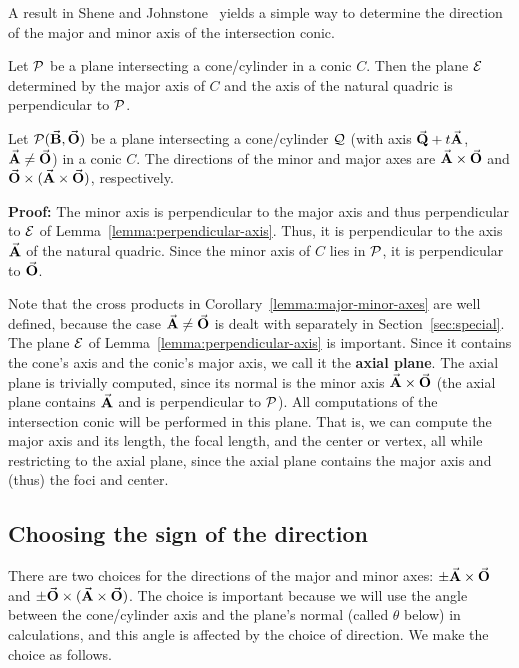 A result in Shene and Johnstone~\cite{shene:1991} 
yields a simple way to determine the direction of the 
major and minor axis of the intersection conic.  

\begin{lemma}
\label{lemma:perpendicular-axis}
    Let ${\cal P}$ be a plane intersecting a cone/cylinder in a conic 
$C$.  Then the plane ${\cal E}$ determined by the major axis of $C$ and the 
axis of the natural quadric is perpendicular to ${\cal P}$.
\end{lemma}

\begin{corollary}
\label{lemma:major-minor-axes}
    Let ${\cal P}(\vec{\bf B},\vec{\bf O})$ be a plane 
intersecting a cone/cylinder ${\cal Q}$ (with axis $\vec{\bf Q}+t\vec{\bf A}$,
$\vec{\bf A}\neq\vec{\bf O}$) in a conic $C$.
The directions of the minor
and major axes are $\vec{\bf A}\times\vec{\bf O}$ and 
$\vec{\bf O}\times(\vec{\bf A}\times\vec{\bf O})$, respectively.  
\end{corollary}
{\bf Proof:}
The minor axis is perpendicular to the major axis and thus perpendicular
to ${\cal E}$ of Lemma~\ref{lemma:perpendicular-axis}.
Thus, it is perpendicular to the axis $\vec{\bf A}$ of the natural quadric.
Since the minor axis of $C$ lies in ${\cal P}$,
it is perpendicular to $\vec{\bf O}$.
\QED

Note that the cross products in
Corollary~\ref{lemma:major-minor-axes} are well defined, because the case
$\vec{\bf A} \neq \vec{\bf O}$ is dealt with separately in 
Section~\ref{sec:special}.
The plane ${\cal E}$ of Lemma~\ref{lemma:perpendicular-axis} is important.
Since it contains the cone's axis and the conic's major axis,
we call it the {\bf axial plane}.
The axial plane is trivially computed, since its normal is the minor axis 
$\vec{\bf A}\times\vec{\bf O}$ (the axial plane contains $\vec{\bf A}$
and is perpendicular to ${\cal P}$).
All computations of the intersection conic will be performed in this plane.
That is, we can compute the major axis and its length, the focal length,
and the center or vertex, all while restricting to the axial plane,
since the axial plane contains the major axis and (thus) the foci and center.

\subsection{Choosing the sign of the direction}

There are two choices for the directions of the major and minor axes:
$\pm \vec{\bf A}\times\vec{\bf O}$ and
$\pm \vec{\bf O}\times(\vec{\bf A}\times\vec{\bf O})$.
The choice is important because we will use the angle between the 
cone/cylinder axis and the plane's normal 
(called $\theta$ below) in calculations, 
and this angle is affected by the choice of direction.
We make the choice as follows.

